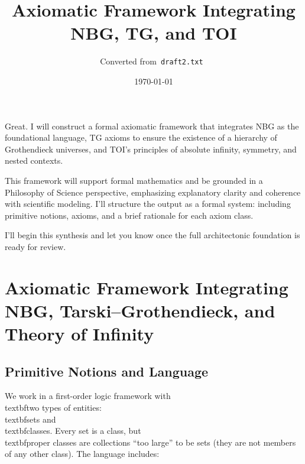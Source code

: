 \documentclass[11pt]{article}
\title{\Huge\bfseries Axiomatic Framework Integrating NBG, TG, and TOI}
\author{Converted from\texttt{ draft2.txt }}
\date{\today}
\begin{document}
\maketitle
Great. I will construct a formal axiomatic framework that integrates NBG as the foundational language, TG axioms to ensure the existence of a hierarchy of Grothendieck universes, and TOI’s principles of absolute infinity, symmetry, and nested contexts.

This framework will support formal mathematics and be grounded in a Philosophy of Science perspective, emphasizing explanatory clarity and coherence with scientific modeling. I’ll structure the output as a formal system: including primitive notions, axioms, and a brief rationale for each axiom class.

I'll begin this synthesis and let you know once the full architectonic foundation is ready for review.


\section*{Axiomatic Framework Integrating NBG, Tarski–Grothendieck, and Theory of Infinity}

\subsection*{Primitive Notions and Language}

We work in a first-order logic framework with \\textbf{two types of entities}: \\textbf{sets} and \\textbf{classes}. Every set is a class, but \\textbf{proper classes} are collections “too large” to be sets (they are not members of any other class). The language includes:
\end{document}
